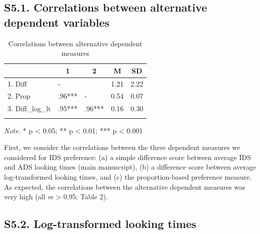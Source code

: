 \documentclass[
  man, donotrepeattitle,floatsintext]{apa6}
\begin{document}
\hypertarget{s5.1.-correlations-between-alternative-dependent-variables}{%
\subsection{S5.1. Correlations between alternative dependent variables}\label{s5.1.-correlations-between-alternative-dependent-variables}}

\begin{table}[tbp]

\begin{center}
\begin{threeparttable}

\caption{\label{tab:unnamed-chunk-25}Correlations between alternative dependent measures}

\begin{tabular}{lllll}
\toprule
 & \multicolumn{1}{c}{1} & \multicolumn{1}{c}{2} & \multicolumn{1}{c}{M} & \multicolumn{1}{c}{SD}\\
\midrule
1. Diff & - &  & 1.21 & 2.22\\
2. Prop & .96*** & - & 0.54 & 0.07\\
3. Diff\_log\_lt & .95*** & .96*** & 0.16 & 0.30\\
\bottomrule
\addlinespace
\end{tabular}

\begin{tablenotes}[para]
\normalsize{\textit{Note.} * p < 0.05; ** p < 0.01; *** p < 0.001}
\end{tablenotes}

\end{threeparttable}
\end{center}

\end{table}

First, we consider the correlations between the three dependent measures we considered for IDS preference: (a) a simple difference score between average IDS and ADS looking times (main manuscript), (b) a difference score between average log-transformed looking times, and (c) the proportion-based preference measure. As expected, the correlations between the alternative dependent measures was very high (all \emph{r}s \textgreater{} 0.95; Table 2).

\hypertarget{s5.2.-log-transformed-looking-times}{%
\subsection{S5.2. Log-transformed looking times}\label{s5.2.-log-transformed-looking-times}}
\end{document}
